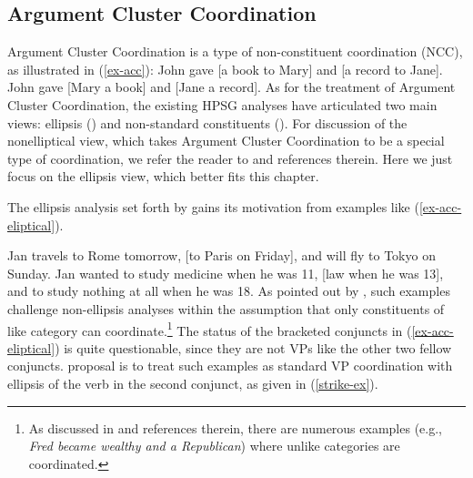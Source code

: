 \subsection{Argument Cluster Coordination}

Argument Cluster Coordination is a type of non-constituent coordination (NCC), as
illustrated in (\ref{ex-acc}):
%
%
\eal
\label{ex-acc}
\ex John gave [a book to Mary] and [a record to Jane].   \label{acc-here}
\ex John gave [Mary a book] and [Jane a record].  \label{acc-1}
\zl
%
%
%
As for the treatment of Argument Cluster Coordination, the existing HPSG analyses have articulated two main views: ellipsis
(\citealt{Yatabe2001, Crysmann2003, Beavers2004}) and non-standard constituents (\citealt{Mouret2006}). For discussion of
the nonelliptical view, which takes Argument Cluster Coordination to be a special type of coordination,
we refer the reader to  and references 
therein. Here we just focus on the ellipsis view, which better fits this chapter.

The ellipsis analysis set forth by \citet{Beavers2004} gains its motivation 
from examples like  (\ref{ex-acc-eliptical}).%

\ealnoraggedright
\label{ex-acc-eliptical}
\ex Jan travels to Rome tomorrow, [to Paris on Friday], and will fly to Tokyo
on Sunday. \label{acc2}
\ex Jan wanted to study medicine when he was 11, [law when he was 13],
and to study nothing at all when he was 18. \label{acc3}\zl
%
As pointed out by \citet{Beavers2004}, such examples challenge non-ellipsis analyses within the assumption that only 
constituents of like category can coordinate.\footnote{As discussed in 
  and references therein, there are numerous examples (e.g., \textit{Fred became wealthy and a Republican}) where unlike categories are coordinated.}
The status of the bracketed conjuncts in (\ref{ex-acc-eliptical}) is quite questionable, since they are not VPs like the other two fellow conjuncts.  proposal is to treat such examples as standard VP coordination with ellipsis of the verb in the second conjunct, as
given in (\ref{strike-ex}). 

